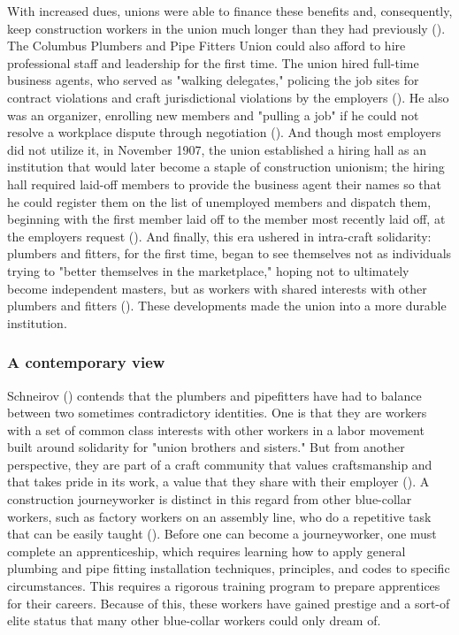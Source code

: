 \documentclass[12pt]{article}
\begin{document}
With increased dues, unions were able to finance these benefits and, consequently, keep construction workers in the union much longer than they had previously (\cite[59]{schneirovPrideSolidarityHistory1993}). The Columbus Plumbers and Pipe Fitters Union could also afford to hire professional staff and leadership for the first time. The union hired full-time business agents, who served as "walking delegates," policing the job sites for contract violations and craft jurisdictional violations by the employers (\citeyear[60]{schneirovPrideSolidarityHistory1993}). He also was an organizer, enrolling new members and "pulling a job" if he could not resolve a workplace dispute through negotiation (\citeyear[60]{schneirovPrideSolidarityHistory1993}). And though most employers did not utilize it, in November 1907, the union established a hiring hall as an institution that would later become a staple of construction unionism; the hiring hall required laid-off members to provide the business agent their names so that he could register them on the list of unemployed members and dispatch them, beginning with the first member laid off to the member most recently laid off, at the employers request (\citeyear[60–61]{schneirovPrideSolidarityHistory1993}). And finally, this era ushered in intra-craft solidarity: plumbers and fitters, for the first time, began to see themselves not as individuals trying to "better themselves in the marketplace," hoping not to ultimately become independent masters, but as workers with shared interests with other plumbers and fitters (\citeyear[61]{schneirovPrideSolidarityHistory1993}). These developments made the union into a more durable institution.

\subsubsection{A contemporary view}

Schneirov (\citeyear{schneirovPrideSolidarityHistory1993}) contends that the plumbers and pipefitters have had to balance between two sometimes contradictory identities. One is that they are workers with a set of common class interests with other workers in a labor movement built around solidarity for "union brothers and sisters." But from another perspective, they are part of a craft community that values craftsmanship and that takes pride in its work, a value that they share with their employer (\cite[3--4]{schneirovPrideSolidarityHistory1993}). A construction journeyworker is distinct in this regard from other blue-collar workers, such as factory workers on an assembly line, who do a repetitive task that can be easily taught (\cite[5]{schneirovPrideSolidarityHistory1993}). Before one can become a journeyworker, one must complete an apprenticeship, which requires learning how to apply general plumbing and pipe fitting installation techniques, principles, and codes to specific circumstances. This requires a rigorous training program to prepare apprentices for their careers. Because of this, these workers have gained prestige and a sort-of elite status that many other blue-collar workers could only dream of.
\end{document}
